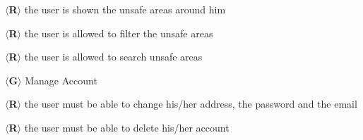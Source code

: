 \documentclass{article}
\begin{document}
\begin{description}
    \item $\langle$\textbf{R}$\rangle$ the user is shown the unsafe areas around
    him
    \item $\langle$\textbf{R}$\rangle$ the user is allowed to filter the unsafe
    areas
    \item $\langle$\textbf{R}$\rangle$ the user is allowed to search unsafe
    areas 
\end{description}    
$\langle$\textbf{G}$\rangle$ Manage Account
\begin{description}
    \item $\langle$\textbf{R}$\rangle$ the user must be able to change his/her
    address, the password and the email
    \item $\langle$\textbf{R}$\rangle$ the user must be able to delete his/her
    account
\end{description}
\end{document}

